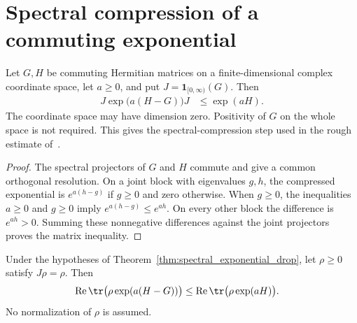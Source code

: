 \section{Spectral compression of a commuting exponential}


\begin{theorem}
    \label{thm:spectral_exponential_drop}
    \leanok
    Let $G,H$ be commuting Hermitian matrices on a finite-dimensional complex
    coordinate space, let $a\ge0$, and put $J=\mathbf1_{[0,\infty)}(G)$.
    Then
    \begin{align}
        J\exp\bigl(a(H-G)\bigr)J & \le \exp(aH).
    \end{align}
    The coordinate space may have dimension zero. Positivity of $G$ on the
    whole space is not required. This gives the spectral-compression step
    used in the rough estimate of~\cite[Section~7]{OpenAI2026AreaLaw}.
\end{theorem}

\begin{proof}\leanok
    The spectral projectors of $G$ and $H$ commute and give a common orthogonal
    resolution. On a joint block with eigenvalues $g,h$, the compressed
    exponential is $e^{a(h-g)}$ if $g\ge0$ and zero otherwise.
    When $g\ge0$, the inequalities $a\ge0$ and $g\ge0$ imply
    $e^{a(h-g)}\le e^{ah}$. On every other block the difference is $e^{ah}>0$.
    Summing these nonnegative differences against the joint projectors proves
    the matrix inequality.
\end{proof}

\begin{theorem}
    \label{thm:supported_trace_exponential_drop}
    \leanok
    Under the hypotheses of Theorem~\ref{thm:spectral_exponential_drop}, let
    $\rho\ge0$ satisfy $J\rho=\rho$. Then
    \begin{align}
        \operatorname{Re}\tr\bigl(\rho\exp(a(H-G))\bigr)
         & \le \operatorname{Re}\tr\bigl(\rho\exp(aH)\bigr).
    \end{align}
    No normalization of $\rho$ is assumed.
\end{theorem}

